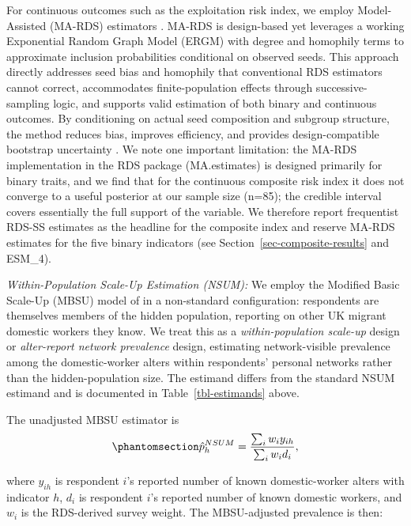 \documentclass[
  12pt,
  letterpaper,
  DIV=11,
  numbers=noendperiod]{scrartcl}
\begin{document}
For continuous outcomes such as the exploitation risk index, we employ
Model-Assisted (MA-RDS) estimators \autocite{gile15-network}. MA-RDS is
design-based yet leverages a working Exponential Random Graph Model
(ERGM) with degree and homophily terms to approximate inclusion
probabilities conditional on observed seeds. This approach directly
addresses seed bias and homophily that conventional RDS estimators
cannot correct, accommodates finite-population effects through
successive-sampling logic, and supports valid estimation of both binary
and continuous outcomes. By conditioning on actual seed composition and
subgroup structure, the method reduces bias, improves efficiency, and
provides design-compatible bootstrap uncertainty
\autocite{gile11-improved}. We note one important limitation: the MA-RDS
implementation in the RDS package (MA.estimates) is designed primarily
for binary traits, and we find that for the continuous composite risk
index it does not converge to a useful posterior at our sample size
(n=85); the credible interval covers essentially the full support of the
variable. We therefore report frequentist RDS-SS estimates as the
headline for the composite index and reserve MA-RDS estimates for the
five binary indicators (see Section~\ref{sec-composite-results} and
ESM\_4).

\emph{Within-Population Scale-Up Estimation (NSUM):} We employ the
Modified Basic Scale-Up (MBSU) model of \textcite{feeh16-generalizing}
in a non-standard configuration: respondents are themselves members of
the hidden population, reporting on other UK migrant domestic workers
they know. We treat this as a \emph{within-population scale-up} design
\autocite[supplementary materials]{feeh16-generalizing} or
\emph{alter-report network prevalence} design, estimating
network-visible prevalence among the domestic-worker alters within
respondents' personal networks rather than the hidden-population size.
The estimand differs from the standard NSUM estimand and is documented
in Table~\ref{tbl-estimands} above.

The unadjusted MBSU estimator is
\begin{equation}\phantomsection\label{eq-1}{\hat p_h^{NSUM}  
=  
\frac{\sum_i w_i y_{ih}}{\sum_i w_i d_i},}\end{equation}

where \(y_{ih}\) is respondent \(i\)'s reported number of known
domestic-worker alters with indicator \(h\), \(d_i\) is respondent
\(i\)'s reported number of known domestic workers, and \(w_i\) is the
RDS-derived survey weight. The MBSU-adjusted prevalence is then:
\end{document}
